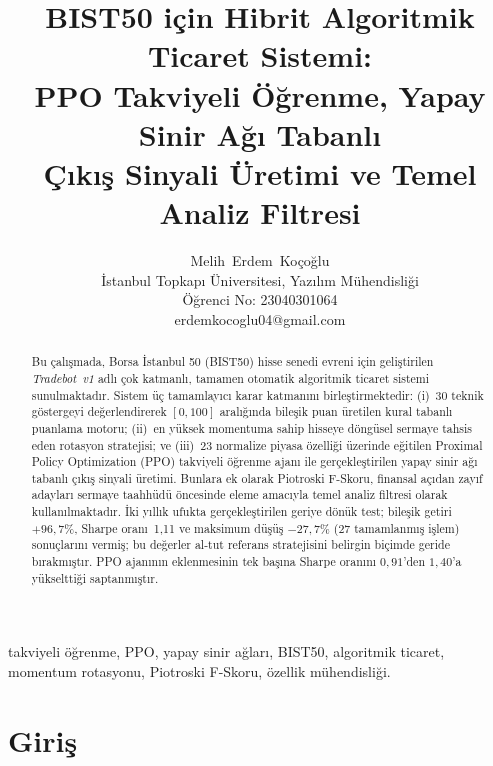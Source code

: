 \documentclass[journal]{IEEEtran}
\begin{document}
\title{BIST50 için Hibrit Algoritmik Ticaret Sistemi:\\
PPO Takviyeli Öğrenme, Yapay Sinir Ağı Tabanlı\\
Çıkış Sinyali Üretimi ve Temel Analiz Filtresi}

\author{Melih~Erdem~Koçoğlu\\
İstanbul Topkapı Üniversitesi, Yazılım Mühendisliği\\
Öğrenci No: 23040301064\\
erdemkocoglu04@gmail.com}

\maketitle

\begin{abstract}
Bu çalışmada, Borsa İstanbul 50 (BIST50) hisse senedi evreni için
geliştirilen \textit{Tradebot~v1} adlı çok katmanlı, tamamen otomatik
algoritmik ticaret sistemi sunulmaktadır. Sistem üç tamamlayıcı karar
katmanını birleştirmektedir: (i)~30 teknik göstergeyi değerlendirerek
$[0,100]$ aralığında bileşik puan üretilen kural tabanlı puanlama
motoru; (ii)~en yüksek momentuma sahip hisseye döngüsel sermaye
tahsis eden rotasyon stratejisi; ve (iii)~23 normalize piyasa
özelliği üzerinde eğitilen Proximal Policy Optimization (PPO)
takviyeli öğrenme ajanı ile gerçekleştirilen yapay sinir ağı tabanlı
çıkış sinyali üretimi. Bunlara ek olarak Piotroski F-Skoru, finansal
açıdan zayıf adayları sermaye taahhüdü öncesinde eleme amacıyla temel
analiz filtresi olarak kullanılmaktadır. İki yıllık ufukta gerçekleştirilen
geriye dönük test; bileşik getiri $+96{,}7\%$, Sharpe oranı~1,11 ve
maksimum düşüş $-27{,}7\%$ (27 tamamlanmış işlem) sonuçlarını
vermiş; bu değerler al-tut referans stratejisini belirgin biçimde
geride bırakmıştır. PPO ajanının eklenmesinin tek başına Sharpe
oranını $0{,}91$'den $1{,}40$'a yükselttiği saptanmıştır.
\end{abstract}

\begin{IEEEkeywords}
takviyeli öğrenme, PPO, yapay sinir ağları, BIST50, algoritmik
ticaret, momentum rotasyonu, Piotroski F-Skoru, özellik mühendisliği.
\end{IEEEkeywords}

\section{Giriş}
\end{document}
